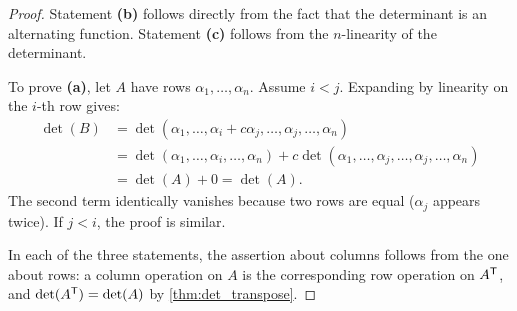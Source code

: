 \begin{proof}
  Statement \textbf{(b)} follows directly from the fact that the determinant is an alternating function. Statement \textbf{(c)} follows from the $n$-linearity of the determinant.

  To prove \textbf{(a)}, let $A$ have rows $\alpha_1, \dots, \alpha_n$. Assume $i < j$. Expanding by linearity on the $i$-th row gives:
  \begin{align*}
    \det(B) &= \det(\alpha_1, \dots, \alpha_i + c\alpha_j, \dots, \alpha_j, \dots, \alpha_n) \\
    &= \det(\alpha_1, \dots, \alpha_i, \dots, \alpha_n) + c \det(\alpha_1, \dots, \alpha_j, \dots, \alpha_j, \dots, \alpha_n) \\
    &= \det(A) + 0 = \det(A).
  \end{align*}
  The second term identically vanishes because two rows are equal ($\alpha_j$ appears twice). If $j < i$, the proof is similar.

  In each of the three statements, the assertion about columns follows from the one about rows: a column operation on $A$ is the corresponding row operation on $A^{\mathsf{T}}$, and $\det(A^{\mathsf{T}}) = \det(A)$ by \cref{thm:det_transpose}.
\end{proof}

